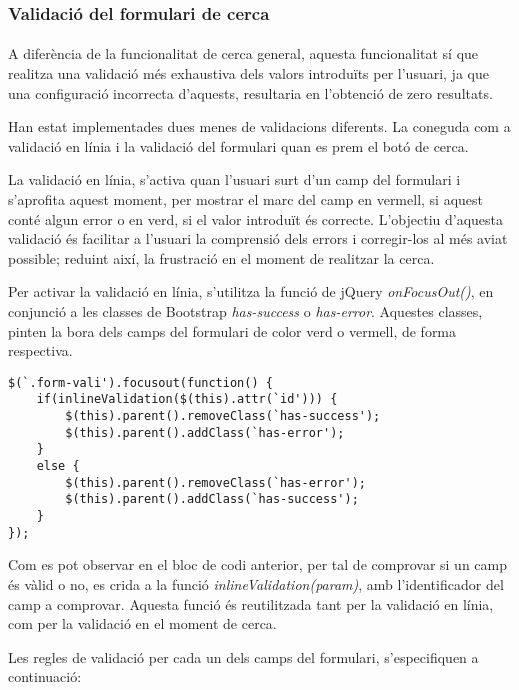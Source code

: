 \subsubsection{Validació del formulari de cerca}

\paragraph{}
A diferència de la funcionalitat de cerca general, aquesta funcionalitat sí que realitza una validació més exhaustiva dels valors introduïts per l'usuari, ja que una configuració incorrecta d'aquests, resultaria en l’obtenció de zero resultats.

Han estat implementades dues menes de validacions diferents. La coneguda com a validació en línia i la validació del formulari quan es prem el botó de cerca.

La validació en línia, s'activa quan l'usuari surt d'un camp del formulari i s'aprofita aquest moment, per mostrar el marc del camp en vermell, si aquest conté algun error o en verd, si el valor introduït és correcte. L'objectiu d'aquesta validació és facilitar a l'usuari la comprensió dels errors i corregir-los al més aviat possible; reduint així, la frustració en el moment de realitzar la cerca.

Per activar la validació en línia, s'utilitza la funció de jQuery \emph{onFocusOut()}, en conjunció a les classes de Bootstrap \emph{has-success} o \emph{has-error}. Aquestes classes, pinten la bora dels camps del formulari de color verd o vermell, de forma respectiva.

\begin{lstlisting}[style=rawOwn,caption={Activació de la validació en línia}]
$(`.form-vali').focusout(function() {
    if(inlineValidation($(this).attr(`id'))) {
        $(this).parent().removeClass(`has-success');
        $(this).parent().addClass(`has-error');
    }
    else {
        $(this).parent().removeClass(`has-error');
        $(this).parent().addClass(`has-success');
    }
});
\end{lstlisting}

Com es pot observar en el bloc de codi anterior, per tal de comprovar si un camp és vàlid o no, es crida a la funció \emph{inlineValidation(param)}, amb l’identificador del camp a comprovar. Aquesta funció és reutilitzada tant per la validació en línia, com per la validació en el moment de cerca.

Les regles de validació per cada un dels camps del formulari, s'especifiquen a continuació:

